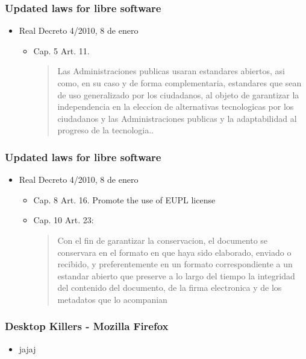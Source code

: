\documentclass{beamer}
\begin{document}
\begin{frame}
\frametitle{Updated laws for libre software}

\begin{itemize}
\item Real Decreto 4/2010, 8 de enero
\begin {itemize}
\item Cap. 5 Art. 11.
\begin{quote}
Las Administraciones publicas usaran estandares abiertos, asi como, en su caso
y de forma complementaria, estandares que sean de uso generalizado por los ciudadanos,
al objeto de garantizar la independencia en la eleccion de alternativas tecnologicas por los
ciudadanos y las Administraciones publicas y la adaptabilidad al progreso de la tecnologia..

\end{quote}


\end{itemize}

\end{itemize}

\end{frame}


\begin{frame}
\frametitle{Updated laws for libre software}

\begin{itemize}
\item Real Decreto 4/2010, 8 de enero
\begin {itemize}

\item Cap. 8 Art. 16. Promote the use of EUPL license 
\item Cap. 10 Art. 23: 
\begin {quote}
Con el fin de garantizar la conservacion, el documento se conservara en el formato
en que haya sido elaborado, enviado o recibido, y preferentemente en un formato
correspondiente a un estandar abierto que preserve a lo largo del tiempo la integridad del
contenido del documento, de la firma electronica y de los metadatos que lo acompanian

\end{quote} 

\end{itemize}

\end{itemize}

\end{frame}

\begin{frame}
\frametitle{Desktop Killers - Mozilla Firefox}

\begin{itemize}
\item jajaj
\end{itemize}

\end{frame}
\end{document}
